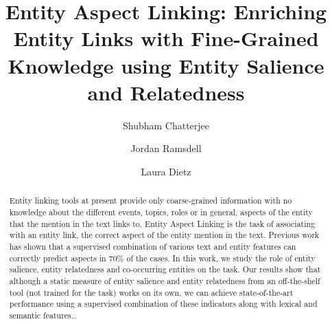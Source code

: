 \documentclass[sigconf,authordraft]{acmart}
\begin{document}
%
\title[Entity Aspect Linking]{Entity Aspect Linking: Enriching Entity Links with Fine-Grained Knowledge using Entity Salience and Relatedness}

%
\author{Shubham Chatterjee}
\author{Jordan Ramsdell}
\author{Laura Dietz}

%
\renewcommand{\shortauthors}{Chatterjee et al.}

%
\begin{abstract}
Entity linking tools at present provide only coarse-grained information with no knowledge about the different events, topics, roles or in general, aspects of the entity that the mention in the text links to. Entity Aspect Linking is the task of associating with an entity link, the correct aspect of the entity mention in the text. Previous work \cite{nanni2018entity} has shown that a supervised combination of various text and entity features can correctly predict aspects in 70\% of the cases. In this work, we study the role of entity salience, entity relatedness and co-occurring entities on the task. Our results show that although a static measure of entity salience and entity relatedness from an off-the-shelf tool (not trained for the task) works on its own, we can achieve state-of-the-art performance using a supervised combination of these indicators along with lexical and semantic features.. 


\end{abstract}
\end{document}
